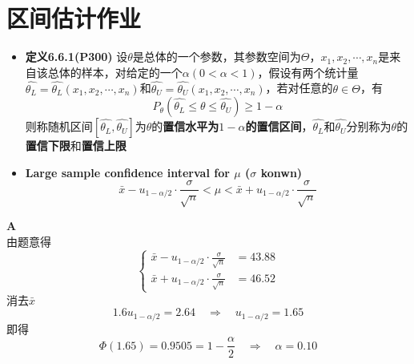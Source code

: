 \documentclass[a4paper]{ctexart}    %
\begin{document}
	\section{区间估计作业}
	\begin{tcolorbox}
		[
		colframe=blue!25,
		colback=blue!10,
		coltitle=blue!20!black,  
		fonttitle=\bfseries,
		adjusted title=Formula Or Theorem:
		]
		\begin{itemize}
			\item \textbf{定义6.6.1(P300)} 设$ \theta $是总体的一个参数，其参数空间为$ \Theta $，$ x_1, x_2, \cdots, x_n $是来自该总体的样本，对给定的一个$ \alpha (0 < \alpha < 1)$，假设有两个统计量$ \hat{\theta_L} = \hat{\theta_L}(x_1, x_2, \cdots, x_n) $和$ \hat{\theta_U} = \hat{\theta_U}(x_1, x_2, \cdots, x_n) $，若对任意的$ \theta \in \Theta $，有
			\begin{equation*}
				P_{\theta} (\hat{\theta_L} \leq \theta \leq \hat{\theta_U}) \geq 1 - \alpha 
			\end{equation*}
			则称随机区间$ [\hat{\theta_L}, \hat{\theta_U}] $为$\theta$的\textbf{置信水平为$ 1-\alpha $的置信区间}，$ \hat{\theta_L} $和$ \hat{\theta_U} $分别称为$\theta$的\textbf{置信下限}和\textbf{置信上限}
			\item \textbf{Large sample confidence interval for $ \mu $ ($ \sigma $ konwn)} 
			\begin{equation*}
				\bar{x} - u_{1 - \alpha / 2} \cdot \frac{\sigma}{\sqrt{n}} < \mu < \bar{x} + u_{1 - \alpha / 2} \cdot \frac{\sigma}{\sqrt{n}}
			\end{equation*}
		\end{itemize}
	\end{tcolorbox}
	 \quad \textbf{A} \\
	由题意得
	\begin{equation*}
		\begin{cases}
			\bar{x} - u_{1 - \alpha / 2} \cdot \frac{\sigma}{\sqrt{n}} &= 43.88 \\
			\bar{x} + u_{1 - \alpha / 2} \cdot \frac{\sigma}{\sqrt{n}} &= 46.52
		\end{cases}
	\end{equation*}
	消去$ \bar{x} $
	\begin{equation*}
		1.6 u_{1 - \alpha / 2} = 2.64 \quad \Rightarrow \quad u_{1 - \alpha / 2} = 1.65
	\end{equation*}
	即得
	\begin{equation*}
		\Phi(1.65) = 0.9505 = 1 - \frac{\alpha}{2} \quad \Rightarrow \quad \alpha = 0.10
	\end{equation*}
\end{document}
